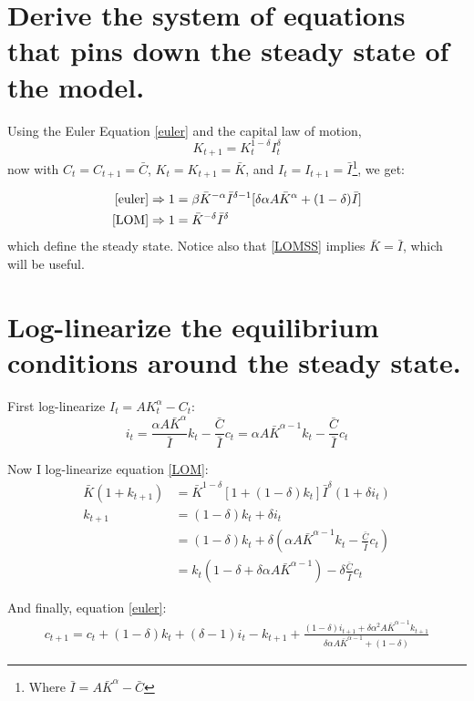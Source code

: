 \documentclass[12pt,oneside,reqno]{amsart}
\begin{document}
\section{Derive the system of equations that pins down the steady state of the model.}

Using the Euler Equation \eqref{euler} and the capital law of motion, 
\begin{equation} \label{LOM}
K_{t+1}=K_{t}^{1-\delta}I_t^\delta 
\end{equation}
now with $C_t = C_{t+1} = \bar{C}$, $K_t=K_{t+1} = \bar{K}$, and $I_t = I_{t+1} = \bar{I}$\footnote{Where $\bar{I} = A\bar{K}^\alpha -\bar{C}$}, we get:

\begin{align}
\eqref{euler} & \Rightarrow 1 = \beta \bar{K}^{-\alpha}\bar{I}^{\delta-1}[\delta\alpha A \bar{K}^\alpha + (1-\delta)\bar{I} ]
\label{eulerSS}\\
\eqref{LOM} & \Rightarrow 1 = \bar{K}^{-\delta}\bar{I}^\delta \label{LOMSS}
\end{align}
which define the steady state. Notice also that \eqref{LOMSS} implies $\bar{K} = \bar{I}$, which will be useful. 


\section{Log-linearize the equilibrium conditions around the steady state.} 
First log-linearize $I_t = AK_t^\alpha -C_t$:
\[i_t = \frac{\alpha A\bar{K}^\alpha}{\bar{I}}k_t -\frac{\bar{C}}{\bar{I}}c_t
= \alpha A\bar{K}^{\alpha-1}k_t -\frac{\bar{C}}{\bar{I}}c_t\]

Now I log-linearize equation \eqref{LOM}:
\begin{align*}
\bar{K}(1+k_{t+1}) & = \bar{K}^{1-\delta}[1+(1-\delta)k_t]\bar{I}^\delta (1+\delta i_t)
\\
k_{t+1} & = (1-\delta)k_t+\delta i_t 
\\
& = (1-\delta)k_t+\delta \left(\alpha A\bar{K}^{\alpha-1}k_t -\frac{\bar{C}}{\bar{I}}c_t\right)
\\
& = k_t\left(1-\delta +\delta\alpha A\bar{K}^{\alpha-1}\right) -\delta\frac{\bar{C}}{\bar{I}}c_t
\end{align*} 


And finally, equation \eqref{euler}:
\begin{align*}
c_{t+1} = c_t+(1-\delta)k_t+(\delta-1)i_t -k_{t+1}
    + \frac{(1-\delta)i_{t+1} +\delta\alpha^2A\bar{K}^{\alpha-1}k_{t+1}} 
        {\delta\alpha A\bar{K}^{\alpha-1} +(1-\delta)}
\end{align*}
\end{document}
